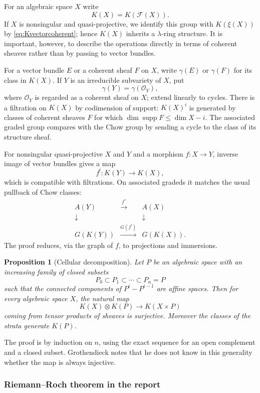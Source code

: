 \documentclass[14pt]{extarticle}
\newcommand{\cO}{\mathcal O}
\newcommand{\cF}{\mathcal F}
\newcommand{\supp}{\operatorname{supp}}
\newtheorem*{proposition*}{Proposition}
\begin{document}
For an algebraic space $X$ write
\[
   K(X)=K(\cF(X)).
\]
If $X$ is nonsingular and quasi-projective, we identify this group with $K(\xi(X))$ by \eqref{eq:Kvectorcoherent}; hence $K(X)$ inherits a $\lambda$-ring structure. It is important, however, to describe the operations directly in terms of coherent sheaves rather than by passing to vector bundles.

For a vector bundle $E$ or a coherent sheaf $F$ on $X$, write $\gamma(E)$ or $\gamma(F)$ for its class in $K(X)$. If $Y$ is an irreducible subvariety of $X$, put
\[
   \gamma(Y)=\gamma(\cO_Y),
\]
where $\cO_Y$ is regarded as a coherent sheaf on $X$; extend linearly to cycles. There is a filtration on $K(X)$ by codimension of support: $K(X)^i$ is generated by classes of coherent sheaves $F$ for which $\dim\supp F\leq \dim X-i$. The associated graded group compares with the Chow group by sending a cycle to the class of its structure sheaf.

For nonsingular quasi-projective $X$ and $Y$ and a morphism $f:X\to Y$, inverse image of vector bundles gives a map
\[
   f^!:K(Y)\to K(X),
\]
which is compatible with filtrations. On associated gradeds it matches the usual pullback of Chow classes:
\[
\begin{array}{ccc}
A(Y) & \xrightarrow{f^*} & A(X) \\
\downarrow & & \downarrow \\
G(K(Y)) & \xrightarrow{G(f^!)} & G(K(X)).
\end{array}
\]
The proof reduces, via the graph of $f$, to projections and immersions.

\begin{proposition*}[Cellular decomposition]
Let $P$ be an algebraic space with an increasing family of closed subsets
\[
P_0\subset P_1\subset\cdots\subset P_n=P
\]
such that the connected components of $P^i-P^{i-1}$ are affine spaces. Then for every algebraic space $X$, the natural map
\[
   K(X)\otimes K(P)\to K(X\times P)
\]
coming from tensor products of sheaves is surjective. Moreover the classes of the strata generate $K(P)$.
\end{proposition*}

The proof is by induction on $n$, using the exact sequence for an open complement and a closed subset. Grothendieck notes that he does not know in this generality whether the map is always injective.

\subsubsection{Riemann--Roch theorem in the report}
\end{document}
